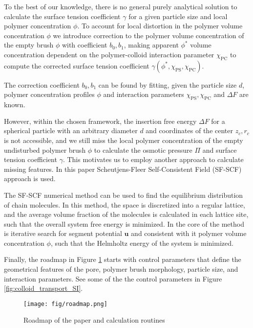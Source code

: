 \documentclass[10pt, a4paper]{article}
\begin{document}
\begin{multicols}{2}
To the best of our knowledge, there is no general purely analytical solution to calculate the surface tension coefficient $\gamma$ for a given particle size and local polymer concentration $\phi$.
To account for local distortion in the polymer volume concentration $\phi$ we introduce correction to the polymer volume concentration of the empty brush $\phi$ with coefficient $b_0, b_1$, making apparent $\phi^{\ast}$ volume concentration dependent on the polymer-colloid interaction parameter $\chi_{\textrm{PC}}$ to compute the corrected surface tension coefficient $\gamma(\phi^{\ast},\chi_{\textrm{PS}}, \chi_{\textrm{PC}})$.

The correction coefficient $b_0, b_1$ can be found by fitting, given the particle size $d$, polymer concentration profiles $\phi$ and interaction parameters $\chi_{\textrm{PS}}, \chi_{\textrm{PC}}$ and $\Delta F$ are known.


However, within the chosen framework, the insertion free energy $\Delta F$ for a spherical particle with an arbitrary diameter $d$ and coordinates of the center $z_c, r_c$ is not accessible, and we still miss the local polymer concentration of the empty undisturbed polymer brush $\phi$ to calculate the osmotic pressure $\Pi$ and surface tension coefficient $\gamma$.
This motivates us to employ another approach to calculate missing features. 
In this paper Scheutjens-Fleer Self-Consistent Field (SF-SCF) approach is used.

The SF-SCF numerical method can be used to find the equilibrium distribution of chain molecules.
In this method, the space is discretized into a regular lattice, and the average volume fraction of the molecules is calculated in each lattice site, such that the overall system free energy is minimized.
In the core of the method is iterative search for segment potential $\mathbf{u}$ and consistent with it polymer volume concentration $\phi$, such that the Helmholtz energy of the system is minimized.

Finally, the roadmap in Figure \ref{fig:paper_roadmap} starts with control parameters that define the geometrical features of the pore, polymer brush morphology, particle size, and interaction parameters.
See some of the the control parameters in Figure \ref{fig:colloid_transport_SI}.

\begin{figure}[H]
    \texttt{[image: fig/roadmap.png]}
    \caption{Roadmap of the paper and calculation routines}
    \label{fig:paper_roadmap}
\end{figure}

\end{multicols}
\end{document}
